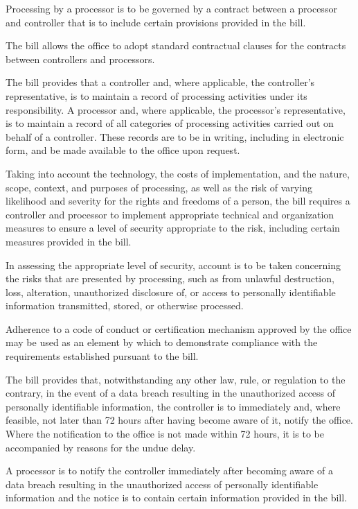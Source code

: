      Processing by a processor is to be governed by a contract between a processor and controller that is to include certain provisions provided in the bill.

     The bill allows the office to adopt standard contractual clauses for the contracts between controllers and processors.

     The bill provides that a controller and, where applicable, the controller's representative, is to maintain a record of processing activities under its responsibility. A processor and, where applicable, the processor's representative, is to maintain a record of all categories of processing activities carried out on behalf of a controller. These records are to be in writing, including in electronic form, and be made available to the office upon request.

     Taking into account the technology, the costs of implementation, and the nature, scope, context, and purposes of processing, as well as the risk of varying likelihood and severity for the rights and freedoms of a person, the bill requires a controller and processor to implement appropriate technical and organization measures to ensure a level of security appropriate to the risk, including certain measures provided in the bill.

     In assessing the appropriate level of security, account is to be taken concerning the risks that are presented by processing, such as from unlawful destruction, loss, alteration, unauthorized disclosure of, or access to personally identifiable information transmitted, stored, or otherwise processed.

     Adherence to a code of conduct or certification mechanism approved by the office may be used as an element by which to demonstrate compliance with the requirements established pursuant to the bill.

     The bill provides that, notwithstanding any other law, rule, or regulation to the contrary, in the event of a data breach resulting in the unauthorized access of personally identifiable information, the controller is to immediately and, where feasible, not later than 72 hours after having become aware of it, notify the office. Where the notification to the office is not made within 72 hours, it is to be accompanied by reasons for the undue delay.

     A processor is to notify the controller immediately after becoming aware of a data breach resulting in the unauthorized access of personally identifiable information and the notice is to contain certain information provided in the bill.


